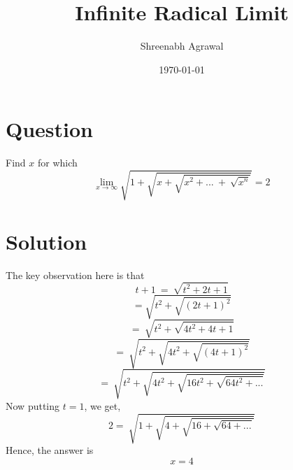\documentclass{article}
\title{Infinite Radical Limit}
\author{Shreenabh Agrawal }
\date{\today}
\begin{document}
\maketitle

\section{Question}
Find $x$ for which
$$\lim_{x\to\infty}\sqrt{1+\sqrt{x+\sqrt{x^{2}+...\ +\ \sqrt{x^{n}}}}}=2 $$
\section{Solution}
The key observation here is that
$$t+1\ =\ \sqrt{t^{2}+2t+1}$$
$$=\sqrt{t^{2}+\sqrt{\left(2t+1\right)^{2}}}$$
$$=\ \sqrt{t^{2}+\sqrt{4t^{2}+4t+1}}$$
$$=\ \sqrt{t^{2}+\sqrt{4t^{2}+\sqrt{\left(4t+1\right)^{2}}}}$$
$$=\ \sqrt{t^{2}+\sqrt{4t^{2}+\sqrt{16t^{2}+\sqrt{64t^{2}+...}}}}$$
Now putting $t=1$, we get,
$$2=\ \sqrt{1+\sqrt{4+\sqrt{16+\sqrt{64+...}}}}$$
Hence, the answer is 
$$\boxed{x=4}$$
\end{document}
